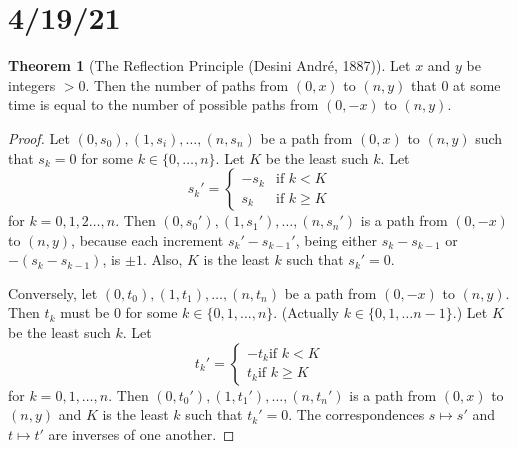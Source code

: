 \documentclass{article}
\theoremstyle{definition}
\newtheorem{theorem}{Theorem}
\begin{document}
\section*{4/19/21}
\begin{theorem}[The Reflection Principle (Desini Andr\'{e}, 1887)]
Let $x$ and $y$ be integers $> 0$. Then the number of paths from $(0,x)$ to $(n,y)$ that $0$ at some time is equal to the number of possible paths from $(0,-x)$ to $(n,y)$.
\end{theorem}
\begin{proof}
    Let $(0,s_0), (1, s_i), \dots, (n, s_n)$ be a path from $(0,x)$ to $(n,y)$ such that $s_k = 0$ for some $k \in \{0, \dots, n\}$. Let $K$ be the least such $k$. Let
    \[
        s_k' = \begin{cases}
            -s_k & \text{if } k < K \\
            s_k & \text{if } k \geq K
        \end{cases}
    \]
    for $k = 0, 1, 2\dots, n$. Then $(0, s_0'), (1, s_1'), \dots, (n, s_n')$ is a path from $(0, -x)$ to $(n,y)$, because each increment $s_k' - s_{k-1}'$, being either $s_k - s_{k-1}$ or $-(s_k - s_{k-1})$, is $\pm 1$. Also, $K$ is the least $k$ such that $s_k' = 0$.
    
    Conversely, let $(0,t_0), (1,t_1), \dots, (n,t_n)$ be a path from $(0, -x)$ to $(n,y)$. Then $t_k$ must be 0 for some $k \in \{0, 1, \dots, n\}$. (Actually $k \in \{0, 1, \dots n-1\}$.) Let $K$ be the least such $k$. Let
    \[
        t_k' = \begin{cases}
            -t_k \text{if } k < K \\
            t_k \text{if } k \geq K
        \end{cases}
    \]
    for $k = 0, 1, \dots, n$. Then $(0,t_0'), (1,t_1'), \dots, (n,t_n')$ is a path from $(0,x)$ to $(n,y)$ and $K$ is the least $k$ such that $t_k' = 0$. The correspondences $s \mapsto s'$ and $t \mapsto t'$ are inverses of one another.
\end{proof}

\begin{center}
\end{center}
\end{document}
